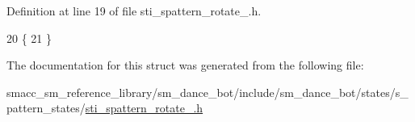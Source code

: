 Definition at line 19 of file sti\+\_\+spattern\+\_\+rotate\+\_.\+h.


\begin{DoxyCode}
20     \{
21     \}
\end{DoxyCode}


The documentation for this struct was generated from the following file\+:\begin{DoxyCompactItemize}
\item 
smacc\+\_\+sm\+\_\+reference\+\_\+library/sm\+\_\+dance\+\_\+bot/include/sm\+\_\+dance\+\_\+bot/states/s\+\_\+pattern\+\_\+states/\hyperlink{include_2sm__dance__bot_2states_2s__pattern__states_2sti__spattern__rotate__1_8h}{sti\+\_\+spattern\+\_\+rotate\+\_.\+h}\end{DoxyCompactItemize}
